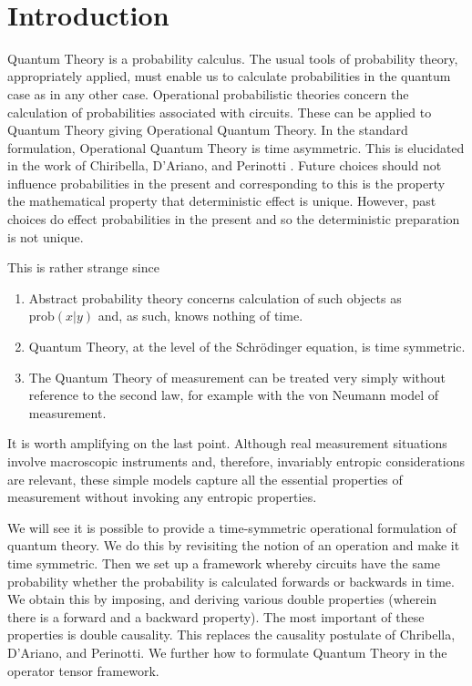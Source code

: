 \documentclass[10pt]{article}
\begin{document}
\newpage

\pagestyle{plain}

\setcounter{page}{1}

{~}

\tableofcontents

\newpage

\setcounter{page}{1}


\section{Introduction}


Quantum Theory is a probability calculus.   The usual tools of probability theory, appropriately applied, must enable us to calculate probabilities in the quantum case as in any other case.  Operational probabilistic theories concern the calculation of probabilities associated with circuits. These can be applied to Quantum Theory giving Operational Quantum Theory. In the standard formulation, Operational Quantum Theory is time asymmetric.  This is elucidated in the work of Chiribella, D'Ariano, and Perinotti \cite{chiribella2010informational}.  Future choices should not influence probabilities in the present and  corresponding to this is the property the mathematical property that deterministic effect is unique.  However, past choices do effect probabilities in the present and so the deterministic preparation is not unique.

This is rather strange since
\begin{enumerate}
\item Abstract probability theory concerns calculation of such objects as $\text{prob}(x|y)$ and, as such, knows nothing of time.
\item Quantum Theory, at the level of the Schr\"odinger equation, is time symmetric.
\item The Quantum Theory of measurement can be treated very simply without reference to the second law, for example with the von Neumann model of measurement.
\end{enumerate}
It is worth amplifying on the last point.  Although real measurement situations involve macroscopic instruments and, therefore, invariably entropic considerations are relevant, these simple models capture all the essential properties of measurement without invoking any entropic properties.

We will see it is possible to provide a time-symmetric operational formulation of quantum theory.  We do this by revisiting the notion of an operation and make it time symmetric. Then we set up a framework whereby circuits have the same probability whether the probability is calculated forwards or backwards in time.  We obtain this by imposing, and deriving various double properties (wherein there is a forward and a backward property).  The most important of these properties is double causality. This replaces the causality postulate of Chribella, D'Ariano, and Perinotti.   We further how to formulate Quantum Theory in the operator tensor framework.   
\end{document}
